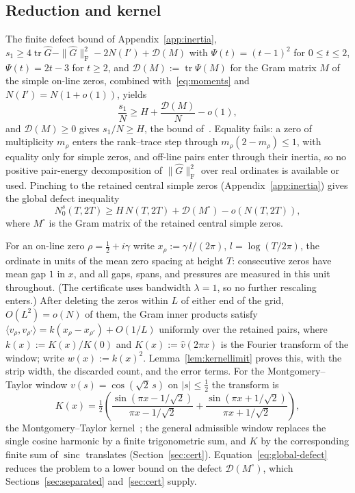 \documentclass[11pt]{article}
\theoremstyle{definition}
\DeclareMathOperator{\tr}{tr}
\newcommand{\F}{\mathrm{F}}
\begin{document}
\subsection{Reduction and kernel}\label{sec:reduction}
The finite defect bound of Appendix~\ref{app:inertia},
$s_1\ge4\tr\widehat G-\|\widehat G\|_{\F}^2-2N(I')+\mathcal D(M)$ with
$\Psi(t)=(t-1)^2$ for $0\le t\le2$, $\Psi(t)=2t-3$ for $t\ge2$, and
$\mathcal D(M):=\tr\Psi(M)$ for the Gram matrix $M$ of the simple on-line
zeros, combined with~\eqref{eq:moments} and $N(I')=N(1+o(1))$, yields
\begin{equation}\label{eq:defect}
  \frac{s_1}{N}\ge H+\frac{\mathcal D(M)}{N}-o(1),
\end{equation}
and $\mathcal D(M)\ge0$ gives $s_1/N\ge H$, the bound of~\cite{AF26}. Equality
fails: a zero of multiplicity $m_\rho$ enters the rank--trace step through
$m_\rho(2-m_\rho)\le1$, with equality only for simple zeros, and off-line pairs
enter through their inertia, so no positive pair-energy decomposition of
$\|\widehat G\|_{\F}^2$ over real ordinates is available or used. Pinching to
the retained central simple zeros (Appendix~\ref{app:inertia}) gives the global
defect inequality
\begin{equation}\label{eq:global-defect}
  N_0^s(T,2T)\ge H\,N(T,2T)+\mathcal D(M^\circ)-o(N(T,2T)),
\end{equation}
where $M^\circ$ is the Gram matrix of the retained central simple zeros.

For an on-line zero $\rho=\tfrac12+i\gamma$ write
$x_\rho:=\gamma\,l/(2\pi)$, $l=\log(T/2\pi)$, the ordinate in units of the mean
zero spacing at height $T$: consecutive zeros have mean gap $1$ in $x$, and all
gaps, spans, and pressures are measured in this unit throughout. (The certificate
uses bandwidth $\lambda=1$, so no further rescaling enters.) After deleting the
zeros within $L$ of either end of the grid, $O(L^2)=o(N)$ of them, the Gram
inner products satisfy
$\langle v_\rho,v_{\rho'}\rangle=k(x_\rho-x_{\rho'})+O(1/L)$ uniformly over the
retained pairs, where
$k(x):=K(x)/K(0)$ and $K(x):=\widehat v(2\pi x)$ is the Fourier transform of the
window; write $w(x):=k(x)^2$. Lemma~\ref{lem:kernellimit} proves this, with the
strip width, the discarded count, and the error terms. For the
Montgomery--Taylor window $v(s)=\cos(\sqrt2\,s)$ on $|s|\le\tfrac12$ the
transform is
\begin{equation}\label{eq:kernel}
  K(x)=\tfrac12\!\left(\frac{\sin(\pi x-1/\sqrt2)}{\pi x-1/\sqrt2}
  +\frac{\sin(\pi x+1/\sqrt2)}{\pi x+1/\sqrt2}\right),
\end{equation}
the Montgomery--Taylor kernel~\cite{Mon73,Mon75}; the general admissible window
replaces the single cosine harmonic by a finite trigonometric sum, and $K$ by the
corresponding finite sum of $\operatorname{sinc}$ translates
(Section~\ref{sec:cert}). Equation~\eqref{eq:global-defect} reduces the problem to
a lower bound on the defect $\mathcal D(M^\circ)$, which Sections~\ref{sec:separated} and~\ref{sec:cert}
supply.
\end{document}

